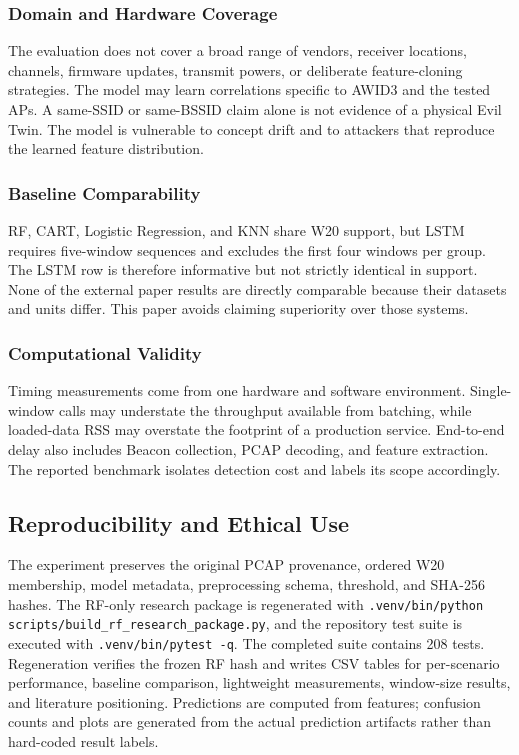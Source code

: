 \documentclass[conference]{IEEEtran}
\begin{document}
\subsubsection{Domain and Hardware Coverage}

The evaluation does not cover a broad range of vendors, receiver locations, channels, firmware updates, transmit powers, or deliberate feature-cloning strategies. The model may learn correlations specific to AWID3 and the tested APs. A same-SSID or same-BSSID claim alone is not evidence of a physical Evil Twin. The model is vulnerable to concept drift and to attackers that reproduce the learned feature distribution.

\subsubsection{Baseline Comparability}

RF, CART, Logistic Regression, and KNN share W20 support, but LSTM requires five-window sequences and excludes the first four windows per group. The LSTM row is therefore informative but not strictly identical in support. None of the external paper results are directly comparable because their datasets and units differ. This paper avoids claiming superiority over those systems.

\subsubsection{Computational Validity}

Timing measurements come from one hardware and software environment. Single-window calls may understate the throughput available from batching, while loaded-data RSS may overstate the footprint of a production service. End-to-end delay also includes Beacon collection, PCAP decoding, and feature extraction. The reported benchmark isolates detection cost and labels its scope accordingly.

\subsection{Reproducibility and Ethical Use}

The experiment preserves the original PCAP provenance, ordered W20 membership, model metadata, preprocessing schema, threshold, and SHA-256 hashes. The RF-only research package is regenerated with \texttt{.venv/bin/python scripts/build\_rf\_research\_package.py}, and the repository test suite is executed with \texttt{.venv/bin/pytest -q}. The completed suite contains 208 tests. Regeneration verifies the frozen RF hash and writes CSV tables for per-scenario performance, baseline comparison, lightweight measurements, window-size results, and literature positioning. Predictions are computed from features; confusion counts and plots are generated from the actual prediction artifacts rather than hard-coded result labels.
\end{document}
